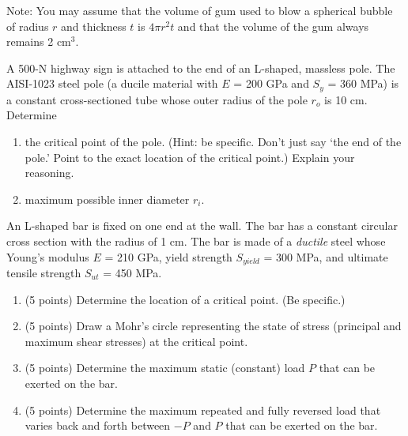 \documentclass[
fontsize=10pt,
a4paper,
twosides=false,
open=any,
svgnames,
]{kaobook} %
\begin{document}
\begin{exercises}
    Note: You may assume that the volume of gum used to blow a spherical bubble of radius $r$ and thickness $t$ is $4\pi r^2 t$ and that the volume of the gum always remains 2 cm$^3$.

  \item A 500-N highway sign is attached to the end of an L-shaped, massless pole. The AISI-1023 steel pole (a ducile material with $E$ = 200 GPa and $S_y$ = 360 MPa) is a constant cross-sectioned tube whose outer radius of the pole $r_o$ is 10 cm. Determine

  \begin{enumerate}
  \item the critical point of the pole. (Hint: be specific. Don't just say `the end of the pole.' Point to the exact location of the critical point.) Explain your reasoning.
  \item maximum possible inner diameter $r_i$.
  \end{enumerate}
  
\item An L-shaped bar is fixed on one end at the wall. The bar has a constant circular cross section with the radius of 1 cm. The bar is made of a \emph{ductile} steel whose Young's modulus $E$ = 210 GPa, yield strength $S_{yield}$ = 300 MPa, and ultimate tensile strength $S_{ut}$ = 450 MPa.

  \begin{center}
  \end{center}

  \begin{enumerate}
  \item (5 points) Determine the location of a critical point. (Be specific.)
  \item (5 points) Draw a Mohr's circle representing the state of stress (principal and maximum shear stresses) at the critical point.
  \item (5 points) Determine the maximum static (constant) load $P$ that can be exerted on the bar.
  \item (5 points) Determine the maximum repeated and fully reversed load that varies back and forth between $-P$ and $P$ that can be exerted on the bar.
  \end{enumerate}


\end{exercises}
\end{document}
